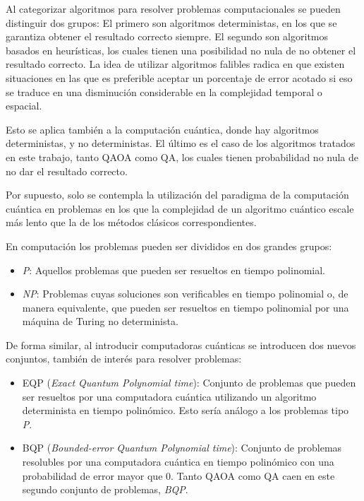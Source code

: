 Al categorizar algoritmos para resolver problemas computacionales se pueden distinguir dos grupos:
El primero son algoritmos deterministas, en los que se garantiza obtener el resultado correcto siempre.
El segundo son algoritmos basados en heurísticas, los cuales tienen una posibilidad no nula de no obtener el resultado correcto.
La idea de utilizar algoritmos falibles radica en que existen situaciones en las que es preferible aceptar un porcentaje de error acotado si eso se traduce en una disminución considerable en la complejidad temporal o espacial.

Esto se aplica también a la computación cuántica, donde hay algoritmos deterministas, y no deterministas.
El último es el caso de los algoritmos tratados en este trabajo, tanto QAOA como QA, los cuales tienen probabilidad no nula de no dar el resultado correcto.

Por supuesto, solo se contempla la utilización del paradigma de la computación cuántica en problemas en los que la complejidad de un algoritmo cuántico escale más lento que la de los métodos clásicos correspondientes.

En computación los problemas pueden ser divididos en dos grandes grupos:

\begin{itemize}
\item \textit{P}: Aquellos problemas que pueden ser resueltos en tiempo polinomial.
\item \textit{NP}: Problemas cuyas soluciones son verificables en tiempo polinomial o, de manera equivalente, que pueden ser resueltos en tiempo polinomial por una máquina de Turing no determinista.
\end{itemize}

De forma similar, al introducir computadoras cuánticas se introducen dos nuevos conjuntos, también de interés para resolver problemas:

\begin{itemize}
\item EQP (\textit{Exact Quantum Polynomial time}):
  Conjunto de problemas que pueden ser resueltos por una computadora cuántica utilizando un algoritmo determinista en tiempo polinómico.
  Esto sería análogo a los problemas tipo \textit{P}.

\item BQP (\textit{Bounded-error Quantum Polynomial time}):
  Conjunto de problemas resolubles por una computadora cuántica en tiempo polinómico con una probabilidad de error mayor que 0.
  Tanto QAOA como QA caen en este segundo conjunto de problemas, \textit{BQP}.
\end{itemize}


